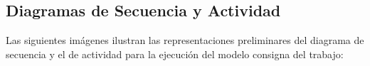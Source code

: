 \documentclass[10pt]{article} %
\begin{document}
\begin{figure}[H] %
\label{fig:CasoDeUso}
\end{figure}

\subsection{Diagramas de Secuencia y Actividad}
Las siguientes imágenes ilustran las representaciones preliminares del diagrama de secuencia y el de actividad para la ejecución del modelo consigna del trabajo:

\begin{figure}[H] %
\label{fig:DiagramaDeSecuencia_Pre}
\end{figure}
\end{document}

